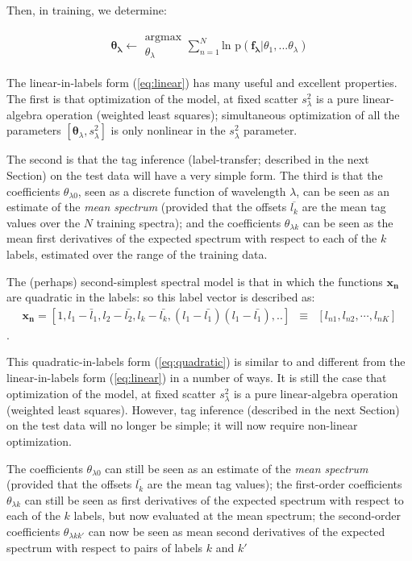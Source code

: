 \documentclass[12pt, preprint]{aastex}
\newcommand{\set}[1]{\bm{#1}}
\newcommand{\mean}[1]{\overline{#1}}
\begin{document}
Then, in training, we determine:

\begin{eqnarray}
\set{\theta_\lambda} \leftarrow \substack{\mbox{argmax}\\
{\theta_\lambda}  }
\sum_{n=1}^N \mbox{ln p}(\set{f_\lambda} | {\theta_1,...\theta_\lambda})
\end{eqnarray}

The linear-in-labels form (\ref{eq:linear}) has many useful and
excellent properties.
The first is that optimization of the model, at fixed scatter
$s_\lambda^2$ is a pure linear-algebra operation (weighted least
squares); simultaneous optimization of all the parameters
$[\set{\theta}_\lambda,s_\lambda^2]$ is only nonlinear in the $s_\lambda^2$
parameter.

%
The second is that the tag inference (label-transfer; described in the
next Section) on the test data will have a very simple form.
The third is that the coefficients $\theta_{\lambda 0}$, seen as a discrete
function of wavelength $\lambda$, can be seen as an estimate of
the \emph{mean spectrum} (provided that the offsets $\mean{l_k}$ are
the mean tag values over the $N$ training spectra); and the
coefficients $\theta_{\lambda k}$ can be seen as the mean first derivatives of
the expected spectrum with respect to each of the $k$ labels, estimated
over the range of the training data.

The (perhaps) second-simplest spectral model is that in which the
functions $\set{x_n}$ are quadratic in the labels: so this label vector is described as:
\begin{eqnarray}
\set{x_n} =  [1, l_1 - \bar{l}_1, l_2 - \bar{l_2}, l_k - \bar{l_k}, (l_1 - \bar{l_1})(l_1 - \bar{l_1}), .. ] &\equiv& [l_{n1}, l_{n2}, \cdots, l_{nK}]
\end{eqnarray}.

This quadratic-in-labels form (\ref{eq:quadratic}) is similar to and
different from the linear-in-labels form (\ref{eq:linear}) in a number
of ways.
It is still the case that optimization of the model, at fixed scatter
$s_\lambda^2$ is a pure linear-algebra operation (weighted least
squares).
However, tag inference (described in the next Section) on the test
data will no longer be simple; it will now require non-linear
optimization.

The coefficients $\theta_{\lambda 0}$ can still be seen as an estimate of the
\emph{mean spectrum} (provided that the offsets $\mean{l_k}$ are the
mean tag values); the first-order coefficients $\theta_{\lambda k}$ can still
be seen as first derivatives of the expected spectrum with respect to
each of the $k$ labels, but now evaluated at the mean spectrum; the
second-order coefficients $\theta_{\lambda kk'}$ can now be seen as mean
second derivatives of the expected spectrum with respect to pairs of
labels $k$ and $k'$
\end{document}
